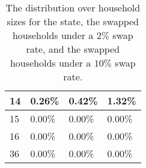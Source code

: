 \begin{table}
\begin{tabular}{|l|l|l|l|}
14                                                       & 0.26\%                                                     & 0.42\%                                                                                       & 1.32\%                                                                                        \\ \hline
15                                                       & 0.00\%                                                     & 0.00\%                                                                                       & 0.00\%                                                                                        \\ \hline
16                                                       & 0.00\%                                                     & 0.00\%                                                                                       & 0.00\%                                                                                        \\ \hline
36                                                       & 0.00\%                                                     & 0.00\%                                                                                       & 0.00\%                                                                                        \\ \hline
\end{tabular}
\caption{The distribution over household sizes for the state, the swapped households under a $2\%$ swap rate, and the swapped households under a $10\%$ swap rate.}
\label{table:hh_dist}
\end{table}

